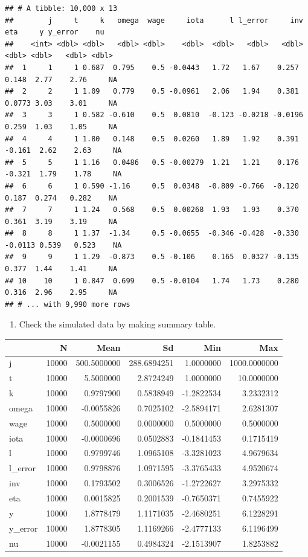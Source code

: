 \documentclass[
]{book}
\providecommand{\tightlist}{%
  \setlength{\itemsep}{0pt}\setlength{\parskip}{0pt}}
\begin{document}
\begin{verbatim}
## # A tibble: 10,000 x 13
##        j     t     k   omega  wage     iota      l l_error     inv     eta     y y_error    nu
##    <int> <dbl> <dbl>   <dbl> <dbl>    <dbl>  <dbl>   <dbl>   <dbl>   <dbl> <dbl>   <dbl> <dbl>
##  1     1     1 0.687  0.795    0.5 -0.0443   1.72   1.67    0.257   0.148  2.77    2.76     NA
##  2     2     1 1.09   0.779    0.5 -0.0961   2.06   1.94    0.381   0.0773 3.03    3.01     NA
##  3     3     1 0.582 -0.610    0.5  0.0810  -0.123 -0.0218 -0.0196  0.259  1.03    1.05     NA
##  4     4     1 1.80   0.148    0.5  0.0260   1.89   1.92    0.391  -0.161  2.62    2.63     NA
##  5     5     1 1.16   0.0486   0.5 -0.00279  1.21   1.21    0.176  -0.321  1.79    1.78     NA
##  6     6     1 0.590 -1.16     0.5  0.0348  -0.809 -0.766  -0.120   0.187  0.274   0.282    NA
##  7     7     1 1.24   0.568    0.5  0.00268  1.93   1.93    0.370   0.361  3.19    3.19     NA
##  8     8     1 1.37  -1.34     0.5 -0.0655  -0.346 -0.428  -0.330  -0.0113 0.539   0.523    NA
##  9     9     1 1.29  -0.873    0.5 -0.106    0.165  0.0327 -0.135   0.377  1.44    1.41     NA
## 10    10     1 0.847  0.699    0.5 -0.0104   1.74   1.73    0.280   0.316  2.96    2.95     NA
## # ... with 9,990 more rows
\end{verbatim}

\begin{enumerate}
\def\labelenumi{\arabic{enumi}.}
\setcounter{enumi}{9}
\tightlist
\item
  Check the simulated data by making summary table.
\end{enumerate}

\begin{tabular}{l|r|r|r|r|r}
\hline
  & N & Mean & Sd & Min & Max\\
\hline
j & 10000 & 500.5000000 & 288.6894251 & 1.0000000 & 1000.0000000\\
\hline
t & 10000 & 5.5000000 & 2.8724249 & 1.0000000 & 10.0000000\\
\hline
k & 10000 & 0.9797900 & 0.5838949 & -1.2822534 & 3.2332312\\
\hline
omega & 10000 & -0.0055826 & 0.7025102 & -2.5894171 & 2.6281307\\
\hline
wage & 10000 & 0.5000000 & 0.0000000 & 0.5000000 & 0.5000000\\
\hline
iota & 10000 & -0.0000696 & 0.0502883 & -0.1841453 & 0.1715419\\
\hline
l & 10000 & 0.9799746 & 1.0965108 & -3.3281023 & 4.9679634\\
\hline
l\_error & 10000 & 0.9798876 & 1.0971595 & -3.3765433 & 4.9520674\\
\hline
inv & 10000 & 0.1793502 & 0.3006526 & -1.2722627 & 3.2975332\\
\hline
eta & 10000 & 0.0015825 & 0.2001539 & -0.7650371 & 0.7455922\\
\hline
y & 10000 & 1.8778479 & 1.1171035 & -2.4680251 & 6.1228291\\
\hline
y\_error & 10000 & 1.8778305 & 1.1169266 & -2.4777133 & 6.1196499\\
\hline
nu & 10000 & -0.0021155 & 0.4984324 & -2.1513907 & 1.8253882\\
\hline
\end{tabular}
\end{document}
